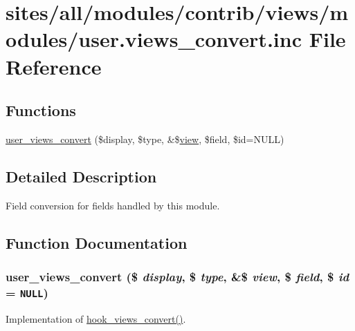 \hypertarget{user_8views__convert_8inc}{
\section{sites/all/modules/contrib/views/modules/user.views\_\-convert.inc File Reference}
\label{user_8views__convert_8inc}
}
\subsection*{Functions}
\begin{CompactItemize}
\item 
\hyperlink{user_8views__convert_8inc_b78624c15c5afbaa4cf0720a2b6ecbbb}{user\_\-views\_\-convert} (\$display, \$type, \&\$\hyperlink{classview}{view}, \$field, \$id=NULL)
\end{CompactItemize}


\subsection{Detailed Description}
Field conversion for fields handled by this module. 

\subsection{Function Documentation}
\hypertarget{user_8views__convert_8inc_b78624c15c5afbaa4cf0720a2b6ecbbb}{
\subsubsection[{user\_\-views\_\-convert}]{\setlength{\rightskip}{0pt plus 5cm}user\_\-views\_\-convert (\$ {\em display}, \/  \$ {\em type}, \/  \&\$ {\em view}, \/  \$ {\em field}, \/  \$ {\em id} = {\tt NULL})}}
\label{user_8views__convert_8inc_b78624c15c5afbaa4cf0720a2b6ecbbb}


Implementation of \hyperlink{group__views__hooks_ge98b0a1c700fe1406af390dfc8c7262e}{hook\_\-views\_\-convert()}. 